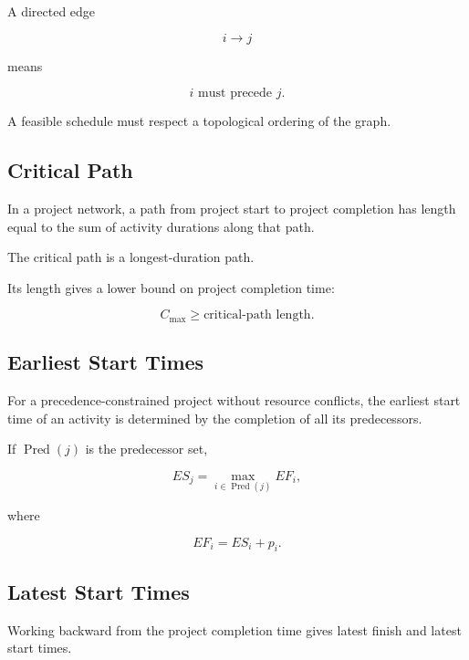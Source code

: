 A directed edge

\[
i\to j
\]

means

\[
\boxed{
i
\text{ must precede }
j.
}
\]

A feasible schedule must respect a topological ordering of the graph.

\subsection{Critical Path}
\label{subsec:scheduling-critical-path}

In a project network, a path from project start to project completion has
length equal to the sum of activity durations along that path.

The critical path is a longest-duration path.

Its length gives a lower bound on project completion time:

\[
\boxed{
C_{\max}
\geq
\text{critical-path length}.
}
\]

\subsection{Earliest Start Times}
\label{subsec:earliest-start-times}

For a precedence-constrained project without resource conflicts, the
earliest start time of an activity is determined by the completion of all
its predecessors.

If \(\operatorname{Pred}(j)\) is the predecessor set,

\[
\boxed{
ES_j
=
\max_{i\in\operatorname{Pred}(j)}
EF_i,
}
\]

where

\[
\boxed{
EF_i
=
ES_i+p_i.
}
\]

\subsection{Latest Start Times}
\label{subsec:latest-start-times}

Working backward from the project completion time gives latest finish and
latest start times.

